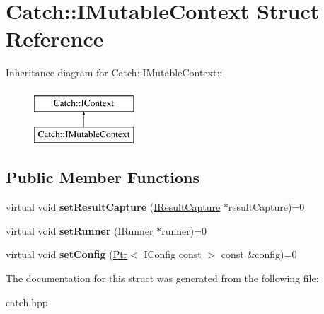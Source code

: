 \hypertarget{structCatch_1_1IMutableContext}{
\section{Catch::IMutableContext Struct Reference}
\label{structCatch_1_1IMutableContext}
}
Inheritance diagram for Catch::IMutableContext::\begin{figure}[H]
\begin{center}
\leavevmode
\includegraphics[height=2cm]{structCatch_1_1IMutableContext}
\end{center}
\end{figure}
\subsection*{Public Member Functions}
\begin{DoxyCompactItemize}
\item 
\hypertarget{structCatch_1_1IMutableContext_a4a80afd0525b7def21bee8d9b48f2d39}{
virtual void {\bfseries setResultCapture} (\hyperlink{structCatch_1_1IResultCapture}{IResultCapture} $\ast$resultCapture)=0}
\label{structCatch_1_1IMutableContext_a4a80afd0525b7def21bee8d9b48f2d39}

\item 
\hypertarget{structCatch_1_1IMutableContext_af2e53b1dea4527a2587cff266a730f6e}{
virtual void {\bfseries setRunner} (\hyperlink{structCatch_1_1IRunner}{IRunner} $\ast$runner)=0}
\label{structCatch_1_1IMutableContext_af2e53b1dea4527a2587cff266a730f6e}

\item 
\hypertarget{structCatch_1_1IMutableContext_a04ae4f4219a481a7bf658d9fd445bc1d}{
virtual void {\bfseries setConfig} (\hyperlink{classCatch_1_1Ptr}{Ptr}$<$ IConfig const  $>$ const \&config)=0}
\label{structCatch_1_1IMutableContext_a04ae4f4219a481a7bf658d9fd445bc1d}

\end{DoxyCompactItemize}


The documentation for this struct was generated from the following file:\begin{DoxyCompactItemize}
\item 
catch.hpp\end{DoxyCompactItemize}
